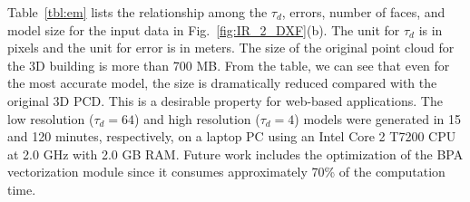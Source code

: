 \documentclass[10pt,twocolumn,letterpaper]{article}
\newcommand{\Eq}[1] {Eq.~(\ref{eq:#1})}
\newcommand{\Fig}[1]{Fig.~\ref{fig:#1}}
\newcommand{\Tbl}[1]{Table~\ref{tbl:#1}}
\newcommand{\Figb}[1]{Fig.~\ref{fig:#1}(b)}
\begin{document}
% 
% 
\Tbl{em} lists the relationship among the $\tau_d$, errors,
number of faces, and model size for the input data in \Figb{IR_2_DXF}.
The unit for $\tau_d$ is in pixels and the unit for error is in meters.
The size of the original point cloud for the 3D building is more than 700 MB.
From the table, we can see that even for the most accurate model, 
the size is dramatically reduced compared with the original 3D PCD.
This is a desirable property for web-based applications.
The low resolution ($\tau_d = 64$) and high resolution ($\tau_d = 4$) models
were generated in 15 and 120 minutes, respectively,
on a laptop PC using an Intel Core 2 T7200 CPU at 2.0 GHz with 2.0 GB RAM.
Future work includes the optimization of the BPA vectorization module since
it consumes approximately 70\% of the computation time.
\end{document}
